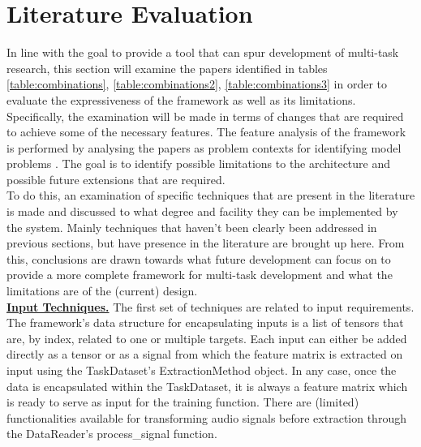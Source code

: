 

\section{Literature Evaluation}


In line with the goal to provide a tool that can spur development of multi-task research, this section will examine the papers identified in tables \ref{table:combinations}, \ref{table:combinations2}, \ref{table:combinations3} in order to evaluate the expressiveness of the framework as well as its limitations. Specifically, the examination will be made in terms of changes that are required to achieve some of the necessary features. The feature analysis of the framework is performed by analysing the papers as problem contexts for identifying model problems \citep{brown1996framework}. The goal is to identify possible limitations to the architecture and possible future extensions that are required. \\

To do this, an examination of specific techniques that are present in the literature is made and discussed to what degree and facility they can be implemented by the system. Mainly techniques that haven't been clearly been addressed in previous sections, but have presence in the literature are brought up here. From this, conclusions are drawn towards what future development can focus on to provide a more complete framework for multi-task development and what the limitations are of the (current) design.\\



\underline{\textbf{Input Techniques.}} The first set of techniques are related to input requirements. The framework's data structure for encapsulating inputs is a list of tensors that are, by index, related to one or multiple targets. Each input can either be added directly as a tensor or as a signal from which the feature matrix is extracted on input using the TaskDataset's ExtractionMethod object. In any case, once the data is encapsulated within the TaskDataset, it is always a feature matrix which is ready to serve as input for the training function. There are (limited) functionalities available for transforming audio signals before extraction through the DataReader's process\_signal function.\\

